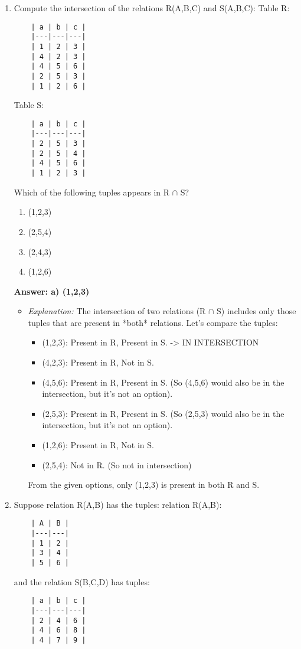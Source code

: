 \documentclass{article}
\begin{document}
\begin{enumerate}[label=\textbf{Question \arabic*.}]
\item Compute the intersection of the relations R(A,B,C) and S(A,B,C):
    Table R:
    \begin{verbatim}
    | a | b | c |
    |---|---|---|
    | 1 | 2 | 3 |
    | 4 | 2 | 3 |
    | 4 | 5 | 6 |
    | 2 | 5 | 3 |
    | 1 | 2 | 6 |
    \end{verbatim}
    Table S:
    \begin{verbatim}
    | a | b | c |
    |---|---|---|
    | 2 | 5 | 3 |
    | 2 | 5 | 4 |
    | 4 | 5 | 6 |
    | 1 | 2 | 3 |
    \end{verbatim}
    Which of the following tuples appears in R $\cap$ S?
    \begin{enumerate}[label=\alph*)]
        \item (1,2,3)
        \item (2,5,4)
        \item (2,4,3)
        \item (1,2,6)
    \end{enumerate}
    \textbf{Answer: a) (1,2,3)}
    \begin{itemize}
        \item \textit{Explanation:} The intersection of two relations (R $\cap$ S) includes only those tuples that are present in *both* relations.
        Let's compare the tuples:
        \begin{itemize}
            \item (1,2,3): Present in R, Present in S. -> IN INTERSECTION
            \item (4,2,3): Present in R, Not in S.
            \item (4,5,6): Present in R, Present in S. (So (4,5,6) would also be in the intersection, but it's not an option).
            \item (2,5,3): Present in R, Present in S. (So (2,5,3) would also be in the intersection, but it's not an option).
            \item (1,2,6): Present in R, Not in S.
            \item (2,5,4): Not in R. (So not in intersection)
        \end{itemize}
        From the given options, only (1,2,3) is present in both R and S.
    \end{itemize}

\item Suppose relation R(A,B) has the tuples:
    relation R(A,B):
    \begin{verbatim}
    | A | B |
    |---|---|
    | 1 | 2 |
    | 3 | 4 |
    | 5 | 6 |
    \end{verbatim}
    and the relation S(B,C,D) has tuples:
    \begin{verbatim}
    | a | b | c |
    |---|---|---|
    | 2 | 4 | 6 |
    | 4 | 6 | 8 |
    | 4 | 7 | 9 |
    \end{verbatim}
    

\end{enumerate}
\end{document}
